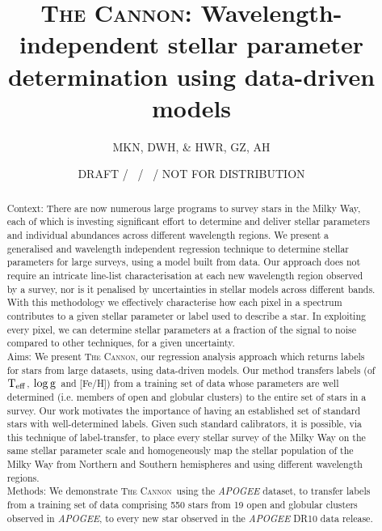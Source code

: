 \documentclass[12pt, preprint]{aastex}
\newcommand{\teff}{\mbox{$\rm T_{eff}$}}
\newcommand{\logg}{\mbox{$\rm \log g$}}
\newcommand{\tc}{\textsc{The Cannon}}
\begin{document}
\title{\textsc{\tc:} Wavelength-independent stellar parameter determination using data-driven models}
\author{
  MKN,
  DWH,
  \&
  HWR,
  GZ, AH} 
\date{DRAFT / \gitdate\ / \githash\ / NOT FOR DISTRIBUTION}



\begin{abstract}

Context: There are now numerous large programs to survey stars in the Milky Way, each of which is investing significant effort to determine and deliver stellar parameters and individual abundances across different wavelength regions. We present a generalised and wavelength independent regression technique to determine stellar parameters for large surveys, using a model built from data. Our approach does not require an intricate line-list characterisation at each new wavelength region observed by a survey, nor is it penalised by uncertainties in stellar models across different bands. With this methodology we effectively characterise how each pixel in a spectrum contributes to a given stellar parameter or label used to describe a star. In exploiting every pixel, we can determine stellar parameters at a fraction of the signal to noise compared to other techniques, for a given uncertainty. \\
Aims: We present \tc, our regression analysis approach which returns labels for stars from large datasets, using data-driven models.  Our method transfers labels (of \teff, \logg\ and [Fe/H]) from a training set of data whose parameters are well determined (i.e. members of open and globular clusters) to the entire set of stars in a survey. Our work motivates the importance of having an established set of standard stars with well-determined labels. Given such standard calibrators, it is possible, via this technique of label-transfer, to place every stellar survey of the Milky Way on the same stellar parameter scale and homogeneously map the stellar population of the Milky Way from Northern and Southern hemispheres and using different wavelength regions. \\
Methods: We demonstrate \tc\ using the \textit{APOGEE} dataset, to transfer labels from a training set of data comprising 550 stars from 19 open and globular clusters observed in \textit{APOGEE}, to every new star observed in the \textit{APOGEE} DR10 data release. \\

\end{abstract}
\end{document}
